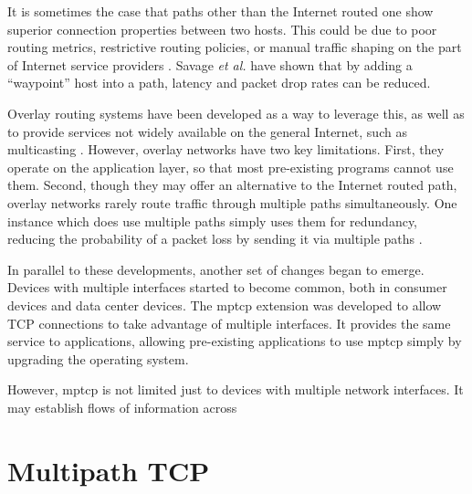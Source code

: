 \documentclass{cwru}
\begin{document}
It is sometimes the case that paths other than the Internet routed one show
superior connection properties between two hosts. This could be due to poor
routing metrics, restrictive routing policies, or manual traffic shaping on the
part of Internet service providers \cite{detour}. Savage \textit{et al.} have
shown that by adding a ``waypoint'' host into a path, latency and packet drop
rates can be reduced.

Overlay routing systems have been developed as a way to leverage this, as well
as to provide services not widely available on the general Internet, such as
multicasting \cite{ron,mbone,jannotti2000overcast}. However, overlay networks
have two key limitations. First, they operate on the application layer, so that
most pre-existing programs cannot use them. Second, though they may offer an
alternative to the Internet routed path, overlay networks rarely route traffic
through multiple paths simultaneously. One instance which does use multiple
paths simply uses them for redundancy, reducing the probability of a packet loss
by sending it via multiple paths \cite{andersen2003best}.

In parallel to these developments, another set of changes began to emerge.
Devices with multiple interfaces started to become common, both in consumer
devices and data center devices. The \ac{mptcp} extension was developed to allow
TCP connections to take advantage of multiple interfaces. It provides the same
service to applications, allowing pre-existing applications to use \ac{mptcp}
simply by upgrading the operating system.

However, \ac{mptcp} is not limited just to devices with multiple network
interfaces. It may establish flows of information across


\section{Multipath TCP}
\end{document}
